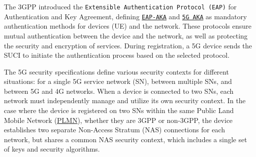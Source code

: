 \documentclass[english]{article}
\begin{document}
The 3GPP introduced the \texttt{Extensible Authentication Protocol (EAP)} for
Authentication and Key Agreement, defining
\texttt{\hyperlink{EAP-AKA}{EAP-AKA}} and \texttt{\hyperlink{5G AKA}{5G AKA}}
as mandatory authentication methods for devices (UE) and the network. These
protocols ensure mutual authentication between the device and the network, as
well as protecting the security and encryption of services. During
registration, a 5G device sends the SUCI to initiate the authentication process
based on the selected protocol.

The 5G security specifications define various security contexts for different
situations: for a single 5G service network (SN), between multiple SNs, and
between 5G and 4G networks. When a device is connected to two SNs, each network
must independently manage and utilize its own security context. In the case
where the device is registered on two SNs within the same Public Land Mobile
Network (\hyperlink{PLMN}{PLMN}), whether they are 3GPP or non-3GPP, the device
establishes two separate Non-Access Stratum (NAS) connections for each network,
but shares a common NAS security context, which includes a single set of keys
and security algorithms.
\end{document}
